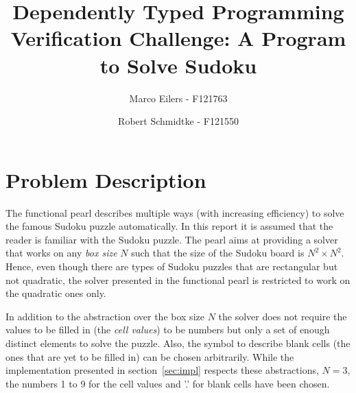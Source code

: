 \documentclass[a4paper,11pt]{article}
\begin{document}
\title{Dependently Typed Programming\\Verification Challenge: A Program to Solve Sudoku}
\author{Marco Eilers - F121763 \and Robert Schmidtke - F121550}

\maketitle


\newpage


\section{Problem Description}
\label{sec:prob-desc}
The functional pearl describes multiple ways (with increasing efficiency) to solve the famous Sudoku puzzle automatically. In this report it is assumed that the reader is familiar with the Sudoku puzzle. The pearl aims at providing a solver that works on any \textit{box size} \(N\) such that the size of the Sudoku board is \(N^2 \times N^2\). Hence, even though there are types of Sudoku puzzles that are rectangular but not quadratic, the solver presented in the functional pearl is restricted to work on the quadratic ones only.

In addition to the abstraction over the box size \(N\) the solver does not require the values to be filled in (the \textit{cell values}) to be numbers but only a set of enough distinct elements to solve the puzzle. Also, the symbol to describe blank cells (the ones that are yet to be filled in) can be chosen arbitrarily. While the implementation presented in section~\ref{sec:impl} respects these abstractions, \(N = 3\), the numbers 1 to 9 for the cell values and '.' for blank cells have been chosen.
\end{document}
